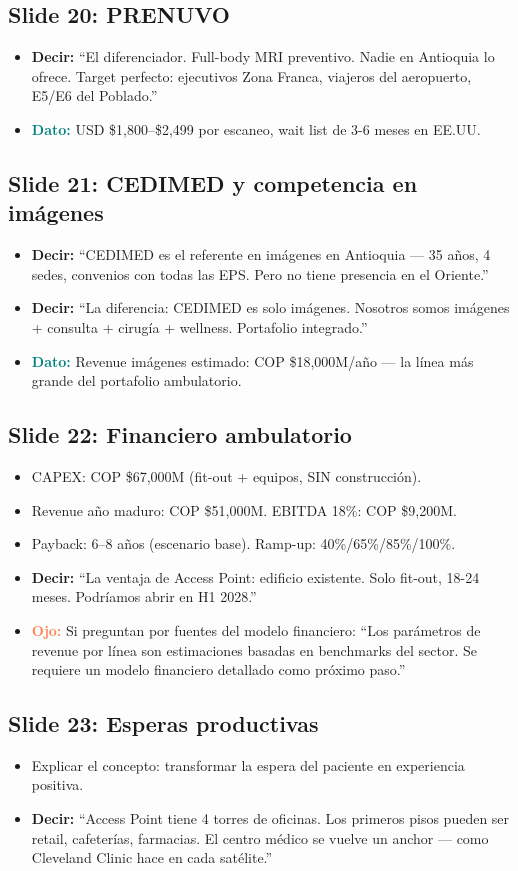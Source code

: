 \documentclass[11pt, a4paper]{article}
\newcommand{\slide}[2]{\subsection{Slide #1: #2}}
\newcommand{\say}[1]{\textcolor{hptu}{\textbf{Decir:}} ``#1''}
\newcommand{\dato}[1]{\textcolor{teal}{\textbf{Dato:}} #1}
\newcommand{\warn}[1]{\textcolor{coral}{\textbf{Ojo:}} #1}
\begin{document}
\slide{20}{PRENUVO}
\begin{itemize}[leftmargin=1cm]
  \item \say{El diferenciador. Full-body MRI preventivo. Nadie en Antioquia lo ofrece. Target perfecto: ejecutivos Zona Franca, viajeros del aeropuerto, E5/E6 del Poblado.}
  \item \dato{USD \$1,800--\$2,499 por escaneo, wait list de 3-6 meses en EE.UU.}
\end{itemize}

\slide{21}{CEDIMED y competencia en imágenes}
\begin{itemize}[leftmargin=1cm]
  \item \say{CEDIMED es el referente en imágenes en Antioquia --- 35 años, 4 sedes, convenios con todas las EPS. Pero no tiene presencia en el Oriente.}
  \item \say{La diferencia: CEDIMED es solo imágenes. Nosotros somos imágenes + consulta + cirugía + wellness. Portafolio integrado.}
  \item \dato{Revenue imágenes estimado: COP \$18,000M/año --- la línea más grande del portafolio ambulatorio.}
\end{itemize}

\slide{22}{Financiero ambulatorio}
\begin{itemize}[leftmargin=1cm]
  \item CAPEX: COP \$67,000M (fit-out + equipos, SIN construcción).
  \item Revenue año maduro: COP \$51,000M. EBITDA 18\%: COP \$9,200M.
  \item Payback: 6--8 años (escenario base). Ramp-up: 40\%/65\%/85\%/100\%.
  \item \say{La ventaja de Access Point: edificio existente. Solo fit-out, 18-24 meses. Podríamos abrir en H1 2028.}
  \item \warn{Si preguntan por fuentes del modelo financiero: ``Los parámetros de revenue por línea son estimaciones basadas en benchmarks del sector. Se requiere un modelo financiero detallado como próximo paso.''}
\end{itemize}

\slide{23}{Esperas productivas}
\begin{itemize}[leftmargin=1cm]
  \item Explicar el concepto: transformar la espera del paciente en experiencia positiva.
  \item \say{Access Point tiene 4 torres de oficinas. Los primeros pisos pueden ser retail, cafeterías, farmacias. El centro médico se vuelve un anchor --- como Cleveland Clinic hace en cada satélite.}
\end{itemize}
\end{document}

